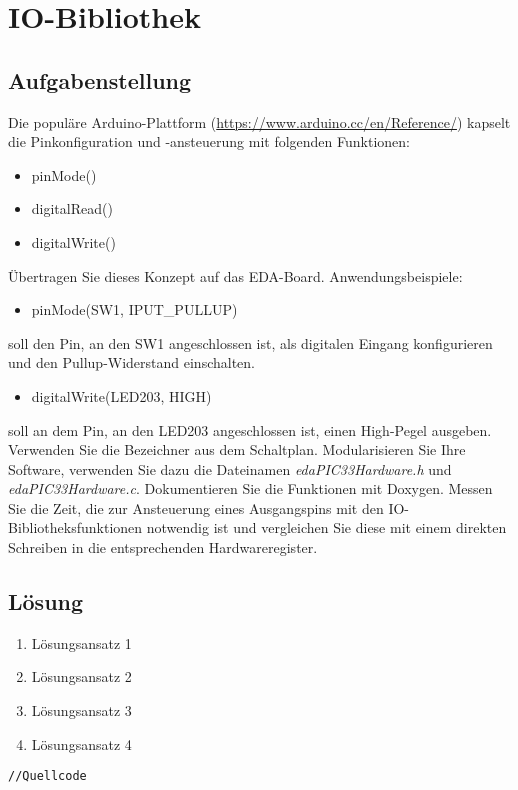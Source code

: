 \section{IO-Bibliothek}
\subsection{Aufgabenstellung}
Die populäre Arduino-Plattform (\url{https://www.arduino.cc/en/Reference/}) 
kapselt die Pinkonfiguration und -ansteuerung mit folgenden Funktionen:
\begin{itemize}
\item pinMode()
\item digitalRead()
\item digitalWrite()
\end{itemize}
Übertragen Sie dieses Konzept auf das EDA-Board. Anwendungsbeispiele:
\begin{itemize}
\item pinMode(SW1, IPUT\_PULLUP)
\end{itemize}
soll den Pin, an den SW1 angeschlossen ist, als digitalen Eingang konfigurieren und den Pullup-Widerstand einschalten.
\begin{itemize}
	\item digitalWrite(LED203, HIGH)
\end{itemize}
soll an dem Pin, an den LED203 angeschlossen ist,
einen High-Pegel ausgeben.
Verwenden Sie die Bezeichner aus dem Schaltplan.
Modularisieren Sie Ihre Software, verwenden Sie dazu die Dateinamen \textit{edaPIC33Hardware.h} und \textit{edaPIC33Hardware.c}.\newline \newline
Dokumentieren Sie die Funktionen mit Doxygen.\newline \newline
Messen Sie die Zeit, die zur Ansteuerung eines Ausgangspins mit den IO-Bibliotheksfunktionen notwendig ist
und vergleichen Sie diese mit einem direkten Schreiben in die entsprechenden Hardwareregister.

\subsection{Lösung}
\begin{enumerate}
		\item Lösungsansatz 1
		\item Lösungsansatz 2
		\item Lösungsansatz 3
		\item Lösungsansatz 4
\end{enumerate}


\begin{lstlisting}[frame=htrbl, caption={Listening Bezeichnung}, label={lst:Referenzname}]
//Quellcode
\end{lstlisting}

